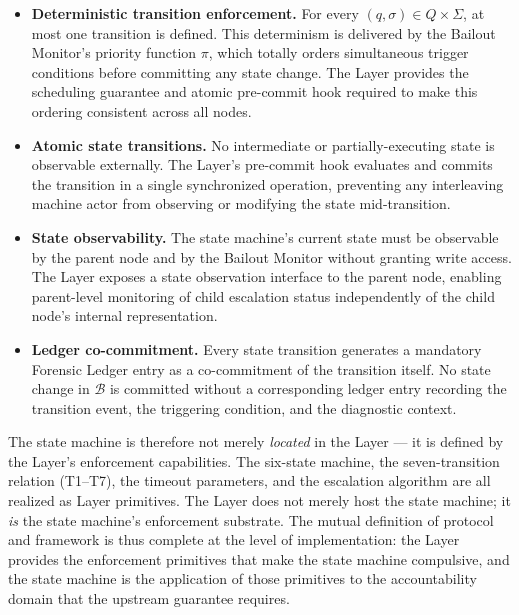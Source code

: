 \begin{itemize}\itemsep=0pt
\item[(\textit{i})] \textbf{Deterministic transition enforcement.} For every $(q, \sigma) \in Q \times \Sigma$, at most one transition is defined. This determinism is delivered by the Bailout Monitor's priority function $\pi$, which totally orders simultaneous trigger conditions before committing any state change. The \fact{} Layer provides the scheduling guarantee and atomic pre-commit hook required to make this ordering consistent across all nodes.

\item[(\textit{ii})] \textbf{Atomic state transitions.} No intermediate or partially-executing state is observable externally. The \fact{} Layer's pre-commit hook evaluates and commits the transition in a single synchronized operation, preventing any interleaving machine actor from observing or modifying the state mid-transition.

\item[(\textit{iii})] \textbf{State observability.} The state machine's current state must be observable by the parent node and by the Bailout Monitor without granting write access. The \fact{} Layer exposes a state observation interface to the parent node, enabling parent-level monitoring of child escalation status independently of the child node's internal representation.

\item[(\textit{iv})] \textbf{Ledger co-commitment.} Every state transition generates a mandatory Forensic Ledger entry as a co-commitment of the transition itself. No state change in $\mathcal{B}$ is committed without a corresponding ledger entry recording the transition event, the triggering condition, and the diagnostic context.
\end{itemize}

The state machine is therefore not merely \emph{located} in the \fact{} Layer — it is defined by the \fact{} Layer's enforcement capabilities. The six-state machine, the seven-transition relation (T1–T7), the timeout parameters, and the escalation algorithm are all realized as \fact{} Layer primitives. The \fact{} Layer does not merely host the state machine; it \emph{is} the state machine's enforcement substrate. The mutual definition of protocol and framework is thus complete at the level of implementation: the \fact{} Layer provides the enforcement primitives that make the state machine compulsive, and the state machine is the application of those primitives to the accountability domain that the upstream guarantee requires.

